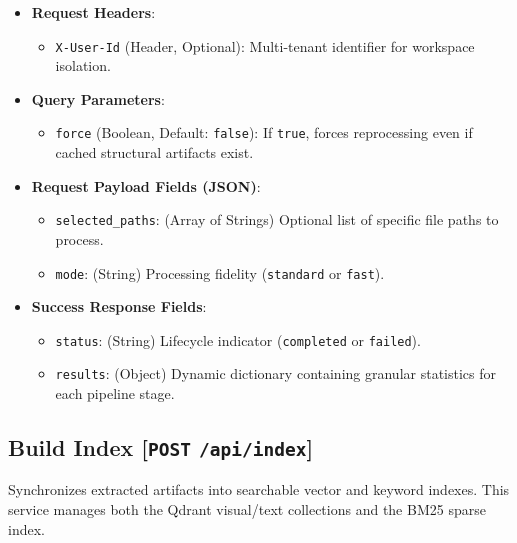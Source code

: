 \begin{itemize}
    \item \textbf{Request Headers}:
    \begin{itemize}
        \item \texttt{X-User-Id} (Header, Optional): Multi-tenant identifier for workspace isolation.
    \end{itemize}
    \item \textbf{Query Parameters}:
    \begin{itemize}
        \item \texttt{force} (Boolean, Default: \texttt{false}): If \texttt{true}, forces reprocessing even if cached structural artifacts exist.
    \end{itemize}
    \item \textbf{Request Payload Fields (JSON)}:
    \begin{itemize}
        \item \texttt{selected\_paths}: (Array of Strings) Optional list of specific file paths to process. 
        \item \texttt{mode}: (String) Processing fidelity (\texttt{standard} or \texttt{fast}).
    \end{itemize}
    \item \textbf{Success Response Fields}:
    \begin{itemize}
        \item \texttt{status}: (String) Lifecycle indicator (\texttt{completed} or \texttt{failed}).
        \item \texttt{results}: (Object) Dynamic dictionary containing granular statistics for each pipeline stage.
    \end{itemize}
\end{itemize}

\subsection{Build Index [\texttt{POST} \texttt{/api/index}]}
Synchronizes extracted artifacts into searchable vector and keyword indexes. This service manages both the Qdrant visual/text collections and the BM25 sparse index.

